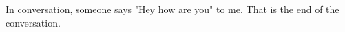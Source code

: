 \documentclass[12pt]{article}
\begin{document}

In conversation, {someone says "Hey how are you" to me}.
That is the end of the conversation.
\end{document}
